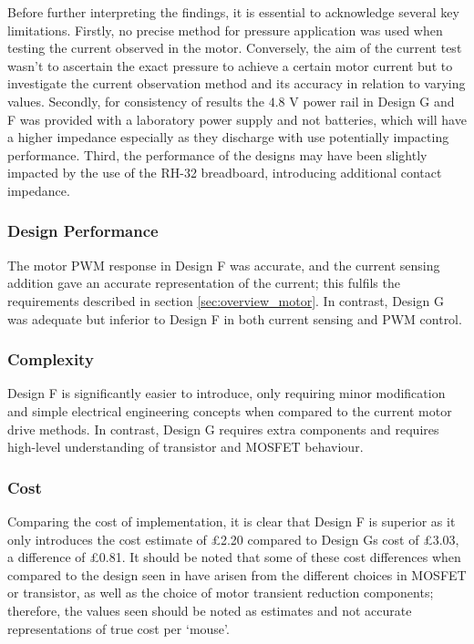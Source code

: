 Before further interpreting the findings, it is essential to acknowledge several key limitations. Firstly, no precise method for pressure application was used when testing the current observed in the motor. Conversely, the aim of the current test wasn't to ascertain the exact pressure to achieve a certain motor current but to investigate the current observation method and its accuracy in relation to varying values. Secondly, for consistency of results the \(4.8\) V power rail in Design G and F was provided with a laboratory power supply and not batteries, which will have a higher impedance especially as they discharge with use potentially impacting performance. Third, the performance of the designs may have been slightly impacted by the use of the RH-32 breadboard, introducing additional contact impedance.

\subsubsection{Design Performance}
The motor PWM response in Design F was accurate, and the current sensing addition gave an accurate representation of the current; this fulfils the requirements described in section \ref{sec:overview_motor}. In contrast, Design G was adequate but inferior to Design F in both current sensing and PWM control.

\subsubsection{Complexity}
Design F is significantly easier to introduce, only requiring minor modification and simple electrical engineering concepts when compared to the current motor drive methods. In contrast, Design G requires extra components and requires high-level understanding of transistor and MOSFET behaviour.

\subsubsection{Cost}
Comparing the cost of implementation, it is clear that Design F is superior as it only introduces the cost estimate of £2.20 compared to Design Gs cost of £3.03, a difference of £0.81. It should be noted that some of these cost differences when compared to the design seen in \cite{Noah2023} have arisen from the different choices in MOSFET or transistor, as well as the choice of motor transient reduction components; therefore, the values seen should be noted as estimates and not accurate representations of true cost per `mouse'.
 
